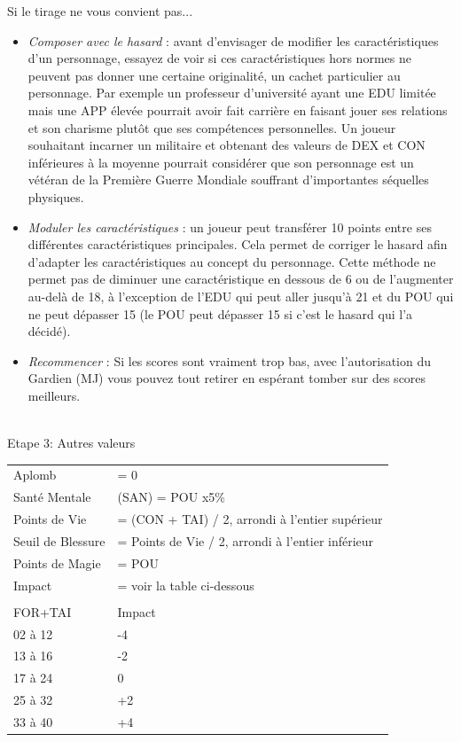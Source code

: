 \documentclass[11pt,twoside,a4paper]{article}
\begin{document}
\begin{multicols*}{2}
Si le tirage ne vous convient pas... %
\begin{itemize}
	\item \emph{Composer avec le hasard} : avant d'envisager de modifier les caract{\'e}ristiques d'un personnage, essayez de voir si ces caract{\'e}ristiques hors normes ne peuvent pas donner une certaine originalit{\'e}, un cachet particulier au personnage. Par exemple un professeur d'universit{\'e} ayant une EDU limit{\'e}e mais une APP {\'e}lev{\'e}e pourrait avoir fait carri{\`e}re en faisant jouer ses relations et son charisme plut{\^o}t que ses comp{\'e}tences personnelles. Un joueur souhaitant incarner un militaire et obtenant des valeurs de DEX et CON inf{\'e}rieures {\`a} la moyenne pourrait consid{\'e}rer que son personnage est un v{\'e}t{\'e}ran de la Premi{\`e}re Guerre Mondiale souffrant d'importantes s{\'e}quelles physiques.
	\item \emph{Moduler les caract{\'e}ristiques} : un joueur peut transf{\'e}rer 10 points entre ses diff{\'e}rentes caract{\'e}ristiques principales. Cela permet de corriger le hasard afin d'adapter les caract{\'e}ristiques au concept du personnage. Cette m{\'e}thode ne permet pas de diminuer une caract{\'e}ristique en dessous de 6 ou de l'augmenter au-del{\`a} de 18, {\`a} l'exception de l'EDU qui peut aller jusqu'{\`a} 21 et du POU qui ne peut d{\'e}passer 15 (le POU peut d{\'e}passer 15 si c'est le hasard qui l'a d{\'e}cid{\'e}).
	\item \emph{Recommencer} : Si les scores sont vraiment trop bas, avec l'autorisation du Gardien (MJ) vous pouvez tout retirer en esp{\'e}rant tomber sur des scores meilleurs.
\end{itemize}~\\

Etape 3: Autres valeurs %
\begin{center}
	\begin{tabular}[c]{ p{3.00cm} p{5.00cm} }
		Aplomb					&	= 0							\\
		Sant{\'e} Mentale		&	(SAN)		= POU x5\%					\\
		Points de Vie			&	= (CON + TAI) / 2, arrondi {\`a} l'entier sup{\'e}rieur	\\
		Seuil de Blessure		&	= Points de Vie / 2, arrondi {\`a} l'entier inf{\'e}rieur	\\
		Points de Magie			&	= POU						\\
		Impact					&	= voir la table ci-dessous	\\
						&			\\
		FOR+TAI			&	Impact	\\
		02 {\`a} 12		&	-4		\\
		13 {\`a} 16		&	-2		\\
		17 {\`a} 24		&	0		\\
		25 {\`a} 32		&	+2		\\
		33 {\`a} 40		&	+4		\\
	\end{tabular}
\end{center}


\end{multicols*}
\end{document}
